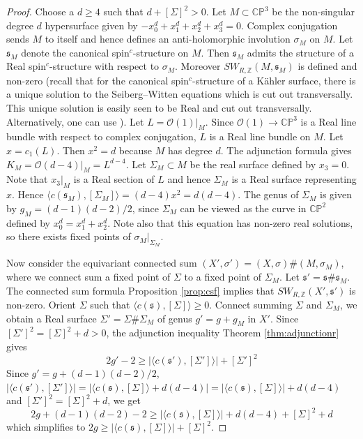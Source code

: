 \documentclass{amsart}
\theoremstyle{definition}
\theoremstyle{remark}
\numberwithin{equation}{section}
\begin{document}
\begin{proof}

Choose a $d \ge 4$ such that $d + [\Sigma]^2 > 0$. Let $M \subset \mathbb{CP}^3$ be the non-singular degree $d$ hypersurface given by $-x_0^d + x_1^d + x_2^d + x_3^d = 0$. Complex conjugation sends $M$ to itself and hence defines an anti-holomorphic involution $\sigma_M$ on $M$. Let $\mathfrak{s}_M$ denote the canonical spin$^c$-structure on $M$. Then $\mathfrak{s}_M$ admits the structure of a Real spin$^c$-structure with respect to $\sigma_M$. Moreover $SW_{R , \mathbb{Z}}(M , \mathfrak{s}_M)$ is defined and non-zero (recall that for the canonical spin$^c$-structure of a K\"ahler surface, there is a unique solution to the Seiberg--Witten equations which is cut out transversally. This unique solution is easily seen to be Real and cut out transversally. Alternatively, one can use \cite[Theorem 1.7]{bar3}). Let $L = \mathcal{O}(1)|_M$. Since $\mathcal{O}(1) \to \mathbb{CP}^3$ is a Real line bundle with respect to complex conjugation, $L$ is a Real line bundle on $M$. Let $x = c_1(L)$. Then $x^2 = d$ because $M$ has degree $d$. The adjunction formula gives $K_M = \mathcal{O}(d-4)|_M = L^{d-4}$. Let $\Sigma_M \subset M$ be the real surface defined by $x_3 = 0$. Note that $x_3|_M$ is a Real section of $L$ and hence $\Sigma_M$ is a Real surface representing $x$. Hence $\langle c(\mathfrak{s}_M) , [\Sigma_M] \rangle = (d-4)x^2 = d(d-4)$. The genus of $\Sigma_M$ is given by $g_M = (d-1)(d-2)/2$, since $\Sigma_M$ can be viewed as the curve in $\mathbb{CP}^2$ defined by $x_0^d = x_1^d + x_2^d$. Note also that this equation has non-zero real solutions, so there exists fixed points of $\sigma_M|_{\Sigma_M}$.

Now consider the equivariant connected sum $(X' , \sigma') = (X , \sigma) \# (M , \sigma_M)$, where we connect sum a fixed point of $\Sigma$ to a fixed point of $\Sigma_M$. Let $\mathfrak{s}' = \mathfrak{s} \# \mathfrak{s}_M$. The connected sum formula Proposition \ref{prop:csf} implies that $SW_{R,\mathbb{Z}}(X' , \mathfrak{s}')$ is non-zero. Orient $\Sigma$ such that $\langle c(\mathfrak{s}) , [\Sigma] \rangle \ge 0$. Connect summing $\Sigma$ and $\Sigma_M$, we obtain a Real surface $\Sigma' = \Sigma \# \Sigma_M$ of genus $g' = g+g_M$ in $X'$. Since $[\Sigma']^2 = [\Sigma]^2 + d > 0$, the adjunction inequality Theorem \ref{thm:adjunctionr} gives
\[
2g' - 2 \ge | \langle c(\mathfrak{s}') , [\Sigma'] \rangle | + [\Sigma']^2
\]
Since $g' = g + (d-1)(d-2)/2$, $|\langle c(\mathfrak{s}') , [\Sigma'] \rangle | = | \langle c(\mathfrak{s}) , [\Sigma] \rangle + d(d-4) | = |\langle c(\mathfrak{s}) , [\Sigma] \rangle | + d(d-4)$ and $[\Sigma']^2 = [\Sigma]^2 + d$, we get
\[
2g + (d-1)(d-2) - 2 \ge |\langle c(\mathfrak{s}) , [\Sigma] \rangle | + d(d-4) + [\Sigma]^2 + d
\]
which simplifies to $2g \ge | \langle c(\mathfrak{s}) , [\Sigma] \rangle | + [\Sigma]^2$.
\end{proof}
\end{document}
